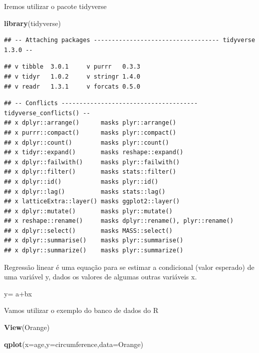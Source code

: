 \documentclass[
]{book}
\newenvironment{Shaded}{\begin{snugshade}}{\end{snugshade}}
\newcommand{\DataTypeTok}[1]{\textcolor[rgb]{0.13,0.29,0.53}{#1}}
\newcommand{\KeywordTok}[1]{\textcolor[rgb]{0.13,0.29,0.53}{\textbf{#1}}}
\newcommand{\NormalTok}[1]{#1}
\begin{document}
Iremos utilizar o pacote tidyverse

\begin{Shaded}
\begin{Highlighting}[]
\KeywordTok{library}\NormalTok{(tidyverse)}
\end{Highlighting}
\end{Shaded}

\begin{verbatim}
## -- Attaching packages ----------------------------------- tidyverse 1.3.0 --
\end{verbatim}

\begin{verbatim}
## v tibble  3.0.1     v purrr   0.3.3
## v tidyr   1.0.2     v stringr 1.4.0
## v readr   1.3.1     v forcats 0.5.0
\end{verbatim}

\begin{verbatim}
## -- Conflicts -------------------------------------- tidyverse_conflicts() --
## x dplyr::arrange()      masks plyr::arrange()
## x purrr::compact()      masks plyr::compact()
## x dplyr::count()        masks plyr::count()
## x tidyr::expand()       masks reshape::expand()
## x dplyr::failwith()     masks plyr::failwith()
## x dplyr::filter()       masks stats::filter()
## x dplyr::id()           masks plyr::id()
## x dplyr::lag()          masks stats::lag()
## x latticeExtra::layer() masks ggplot2::layer()
## x dplyr::mutate()       masks plyr::mutate()
## x reshape::rename()     masks dplyr::rename(), plyr::rename()
## x dplyr::select()       masks MASS::select()
## x dplyr::summarise()    masks plyr::summarise()
## x dplyr::summarize()    masks plyr::summarize()
\end{verbatim}

Regressão linear é uma equação para se estimar a condicional (valor esperado) de
uma variável y, dados os valores de algumas outras variáveis x.

y= a+bx

Vamos utilizar o exemplo do banco de dados do R

\begin{Shaded}
\begin{Highlighting}[]
\KeywordTok{View}\NormalTok{(Orange)}
\end{Highlighting}
\end{Shaded}

\begin{Shaded}
\begin{Highlighting}[]
\KeywordTok{qplot}\NormalTok{(}\DataTypeTok{x=}\NormalTok{age,}\DataTypeTok{y=}\NormalTok{circumference,}\DataTypeTok{data=}\NormalTok{Orange)}
\end{Highlighting}
\end{Shaded}
\end{document}
